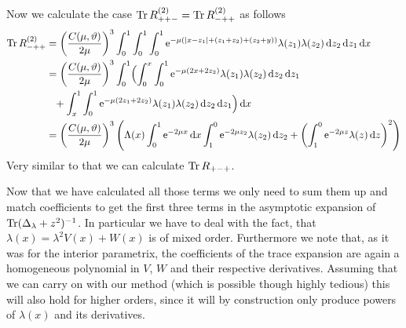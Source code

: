 Now we calculate the case $\Tr R^{(2)}_{++-} =  \Tr R^{(2)}_{-++}$ as follows
\begin{align*}
    \Tr R^{(2)}_{-++} &= \left(\frac{C(\mu,\theta)}{2\mu}\right)^3
        \Integ[1]{0}{x}{
            \Integ[1]{0}{z_1}{
                \Integ[1]{0}{z_2}{
                    \Eto{-\mu(\left|x-z_1\right| + (z_1 + z_2) + (z_2 + y))}
                    \lambda(z_1)\lambda(z_2)
                }
            }
        } \\
        &= \left(\frac{C(\mu,\theta)}{2\mu}\right)^3
            \Integ[1]{0}{x}{
                \Bigl(
                \Integ[x]{0}{z_1}{
                    \Integ[1]{0}{z_2}{
                        \Eto{-\mu(2x+2z_2)}\lambda(z_1)\lambda(z_2)
                    }
                    } \\ &\hphantom{=} + 
                \Integ[1]{x}{z_1}{
                    \Integ[1]{0}{z_2}{
                        \Eto{-\mu(2z_1+2z_2)}\lambda(z_1)\lambda(z_2)
                    }
                }
                \Bigr)
            } \\
        &= \left(\frac{C(\mu,\theta)}{2\mu}\right)^3 \left(
            \Lambda(x) \Integ[1]{0}{x}{\Eto{-2\mu x}}
            \Integ[0]{1}{z_2}{\Eto{-2\mu z_2}\lambda(z_2)}
            + \left(\Integ[0]{1}{z}{\Eto{-2\mu z}\lambda(z)}\right)^2
            \right)
\end{align*}
Very similar to that we can calculate $\Tr R_{+-+}$.



Now that we have calculated all those terms we only need to sum them up and
match coefficients to get the first three terms in the asymptotic expansion of
$\Tr(\Delta_\lambda + z^2)^{-1}$. In particular we have to deal with the fact,
that $\lambda(x) = \lambda^2 V(x) + W(x)$ is of mixed order. Furthermore we note
that, as it was for the interior parametrix, the coefficients of the trace
expansion are again a homogeneous polynomial in $V$, $W$ and their respective
derivatives. Assuming that we can carry on with our method (which is possible
though highly tedious) this will also hold for higher orders, since it will by
construction only produce powers of $\lambda(x)$ and its derivatives.

